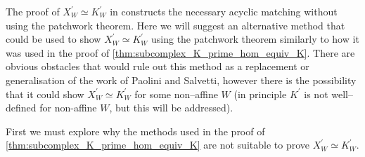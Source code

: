 \documentclass[class=article, crop=false]{standalone}
\begin{document}
The proof of $X^\prime_W \simeq K^\prime_W$ in \cite[Section 8]{paolini_salvetti_kpi1_2021} constructs the necessary acyclic matching without using the patchwork theorem. Here we will suggest an alternative method that could be used to show $X^\prime_W \simeq K^\prime_W$ using the patchwork theorem similarly to how it was used in the proof of \cref{thm:subcomplex_K_prime_hom_equiv_K}. There are obvious obstacles that would rule out this method as a replacement or generalisation of the work of Paolini and Salvetti, however there is the possibility that it could show $X^\prime_W \simeq K^\prime_W$ for some non--affine $W$ (in principle $K^\prime$ is not well--defined for non-affine $W$, but this will be addressed).

First we must explore why the methods used in the proof of \cref{thm:subcomplex_K_prime_hom_equiv_K} are not suitable to prove $X^\prime_W \simeq K^\prime_W$.
\end{document}
